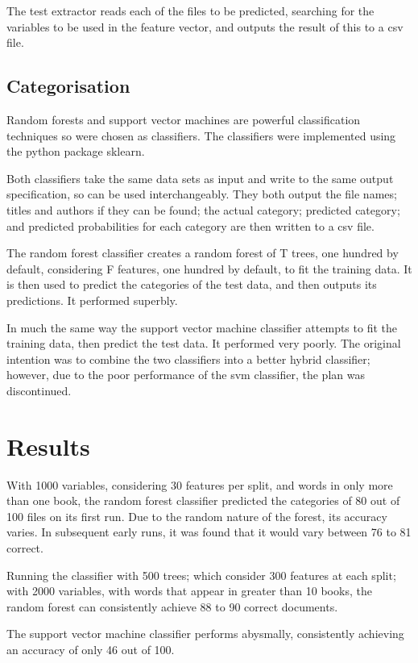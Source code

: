 \documentclass[11pt]{article}
\begin{document}
The test extractor reads each of the files to be predicted, searching for the
variables to be used in the feature vector, and outputs the result of this to a
csv file.

\subsection{Categorisation}

Random forests and support vector machines are powerful classification
techniques so were chosen as classifiers. The classifiers were implemented using
the python package sklearn.

Both classifiers take the same data sets as input and write to the same output
specification, so can be used interchangeably. They both output the file names;
titles and authors if they can be found; the actual category; predicted
category; and predicted probabilities for each category are then written to a
csv file.

The random forest classifier creates a random forest of T trees, one hundred by
default, considering F features, one hundred by default, to fit the training
data. It is then used to predict the categories of the test data, and then
outputs its predictions. It performed superbly.

In much the same way the support vector machine classifier attempts to fit the
training data, then predict the test data. It performed very poorly.  The
original intention was to combine the two classifiers into a better hybrid
classifier; however, due to the poor performance of the svm classifier, the plan
was discontinued.

\section{Results}

With 1000 variables, considering 30 features per split, and words in only more
than one book, the random forest classifier predicted the categories of 80 out
of 100 files on its first run. Due to the random nature of the forest, its
accuracy varies. In subsequent early runs, it was found that it would vary
between 76 to 81 correct.

Running the classifier with 500 trees; which consider 300 features at each
split; with 2000 variables, with words that appear in greater than 10 books, the
random forest can consistently achieve 88 to 90 correct documents.

The support vector machine classifier performs abysmally, consistently achieving
an accuracy of only 46 out of 100.
\end{document}
